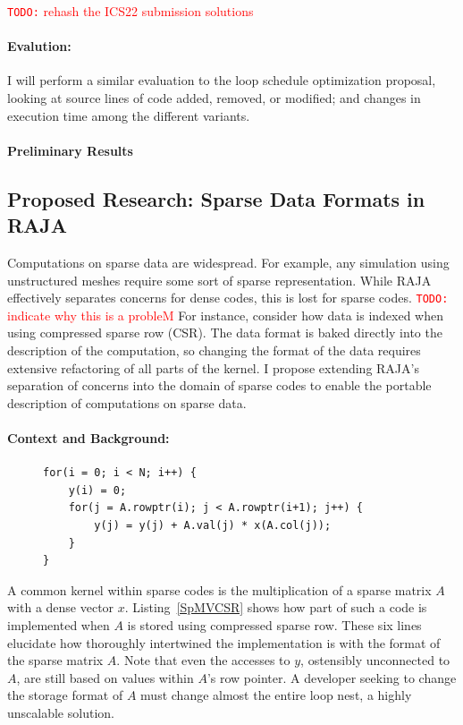 \documentclass{article}
\newcommand{\todo}[1]{{\textcolor{red}{{\tt{TODO:}}\,\,#1 }}}
\begin{document}
\todo{rehash the ICS22 submission solutions}

\paragraph{Evalution:}

I will perform a similar evaluation to the loop schedule optimization proposal, looking at source lines of code added, removed, or modified; and changes in execution time among the different variants.

\paragraph{Preliminary Results}


\subsection{Proposed Research: Sparse Data Formats in RAJA}

Computations on sparse data are widespread. 
For example, any simulation using unstructured meshes require some sort of sparse representation.
While RAJA effectively separates concerns for dense codes, this is lost for sparse codes.
\todo{indicate why this is a probleM}
For instance, consider how data is indexed when using compressed sparse row (CSR). 
The data format is baked directly into the description of the computation, so changing the format of the data requires extensive refactoring of all parts of the kernel.
I propose extending RAJA's separation of concerns into the domain of sparse codes to enable the portable description of computations on sparse data.

\paragraph{Context and Background:}
\begin{figure}
\begin{lstlisting}[caption={CSR-stored sparse matrix vector multiplication},label={SpMVCSR}]
for(i = 0; i < N; i++) {
    y(i) = 0;
    for(j = A.rowptr(i); j < A.rowptr(i+1); j++) {
        y(j) = y(j) + A.val(j) * x(A.col(j));
    }
}
\end{lstlisting}
\end{figure}

A common kernel within sparse codes is the multiplication of a sparse matrix $A$ with a dense vector $x$.
Listing~\ref{SpMVCSR} shows how part of such a code is implemented when $A$ is stored using compressed sparse row.
These six lines elucidate how thoroughly intertwined the implementation is with the format of the sparse matrix $A$.
Note that even the accesses to $y$, ostensibly unconnected to $A$, are still based on values within $A$'s row pointer.
A developer seeking to change the storage format of $A$ must change almost the entire loop nest, a highly unscalable solution.
\end{document}
